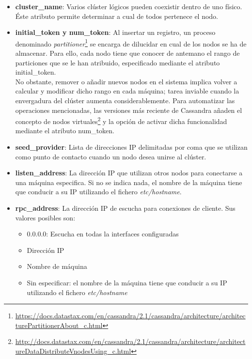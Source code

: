 \begin{itemize}

\item \textbf{cluster\_name}: Varios clúster lógicos pueden coexistir dentro de uno físico. Éste atributo permite determinar a cual de todos pertenece el nodo.

\item \textbf{initial\_token y num\_token}: Al insertar un registro, un proceso denominado \textit{partitioner}\footnote{\url{https://docs.datastax.com/en/cassandra/2.1/cassandra/architecture/architecturePartitionerAbout_c.html}} se encarga de dilucidar en cual de los nodos se ha de almacenar. Para ello, cada nodo tiene que conocer de antemano el rango de particiones que se le han atribuido, especificado mediante el atributo initial\_token.\\

No obstante, remover o añadir nuevos nodos en el sistema implica volver a calcular y modificar dicho rango en cada máquina; tarea inviable cuando la envergadura del clúster aumenta considerablemente. Para automatizar las operaciones mencionadas, las versiones más reciente de Cassandra añaden el concepto de nodos virtuales\footnote{\url{http://docs.datastax.com/en/cassandra/2.1/cassandra/architecture/architectureDataDistributeVnodesUsing_c.html}} y la opción de activar dicha funcionalidad mediante el atributo num\_token.

\item \textbf{seed\_provider}: Lista de direcciones IP delimitadas por coma que se utilizan como punto de contacto cuando un nodo desea unirse al clúster.

\item \textbf{listen\_address}: La dirección IP que utilizan otros nodos para conectarse a una máquina especifica. Si no se indica nada, el nombre de la máquina tiene que conducir a su IP utilizando el fichero \textit{etc/hostname}.

\item \textbf{rpc\_address}: La dirección IP de escucha para conexiones de cliente. Sus valores posibles son:

\begin{itemize}
	\item 0.0.0.0: Escucha en todas la interfaces configuradas
	\item Dirección IP
	\item Nombre de máquina
	\item Sin especificar: el nombre de la máquina tiene que conducir a su IP utilizando el fichero \textit{etc/hostname}
\end{itemize}


\end{itemize}
